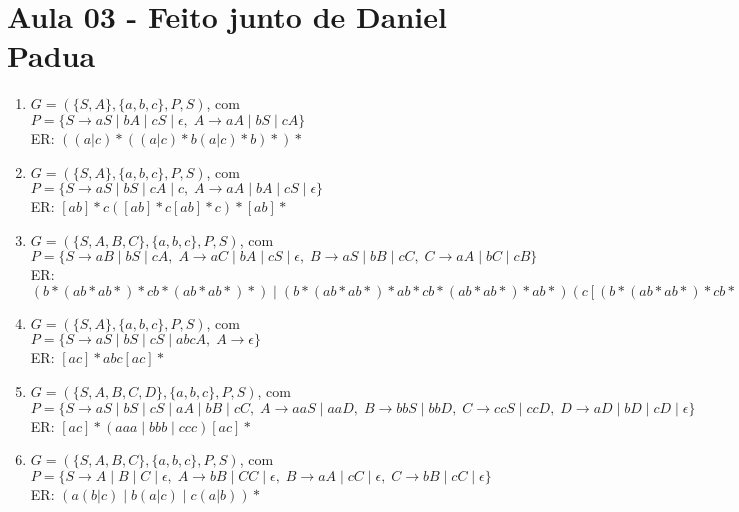 \section{Aula 03 - Feito junto de Daniel Padua}


\begin{enumerate}
    \item[30)] 
    $G = (\{S,A\}, \{a,b,c\}, P, S)$, com \\
    $P = \{ S \to aS \mid bA \mid cS \mid \epsilon,\;
    A \to aA \mid bS \mid cA \}$ \\[6pt]
    ER: $((a|c)*((a|c)*b(a|c)*b)*)*$

    \item[31)] 
    $G = (\{S,A\}, \{a,b,c\}, P, S)$, com \\
    $P = \{ S \to aS \mid bS \mid cA \mid c,\;
    A \to aA \mid bA \mid cS \mid \epsilon \}$ \\[6pt]
    ER: $[ab]*c([ab]*c[ab]*c)*[ab]*$

    \item[32)] 
    $G = (\{S,A,B,C\}, \{a,b,c\}, P, S)$, com \\
    $P = \{ 
    S \to aB \mid bS \mid cA,\;
    A \to aC \mid bA \mid cS \mid \epsilon,\;
    B \to aS \mid bB \mid cC,\;
    C \to aA \mid bC \mid cB \}$ \\[6pt]
    ER: $(b*(ab*ab*)*cb*(ab*ab*)*) \mid (b*(ab*ab*)*ab*cb*(ab*ab*)*ab*)(c[(b*(ab*ab*)*cb*(ab*ab*)*) \mid (b*(ab*ab*)*ab*cb*(ab*ab*)*ab*)])* $

    \item[33)] 
    $G = (\{S,A\}, \{a,b,c\}, P, S)$, com \\
    $P = \{ 
    S \to aS \mid bS \mid cS \mid abcA,\;
    A \to \epsilon \}$ \\[6pt]
    ER: $[ac]*abc[ac]*$

    \item[34)] 
    $G = (\{S,A,B,C,D\}, \{a,b,c\}, P, S)$, com \\
    $P = \{ 
    S \to aS \mid bS \mid cS \mid aA \mid bB \mid cC,\;
    A \to aaS \mid aaD,\;
    B \to bbS \mid bbD,\;
    C \to ccS \mid ccD,\;
    D \to aD \mid bD \mid cD \mid \epsilon \}$ \\[6pt]
    ER: $[ac]*(aaa \mid bbb \mid ccc)[ac]*$

    \item[35)] 
    $G = (\{S,A,B,C\}, \{a,b,c\}, P, S)$, com \\
    $P = \{ 
    S \to A \mid B \mid C \mid \epsilon,\;
    A \to bB \mid CC \mid \epsilon,\;
    B \to aA \mid cC \mid \epsilon,\;
    C \to bB \mid cC \mid \epsilon \}$ \\[6pt]
    ER: $(a(b|c) \mid b(a|c) \mid c(a|b))*$


\end{enumerate}
